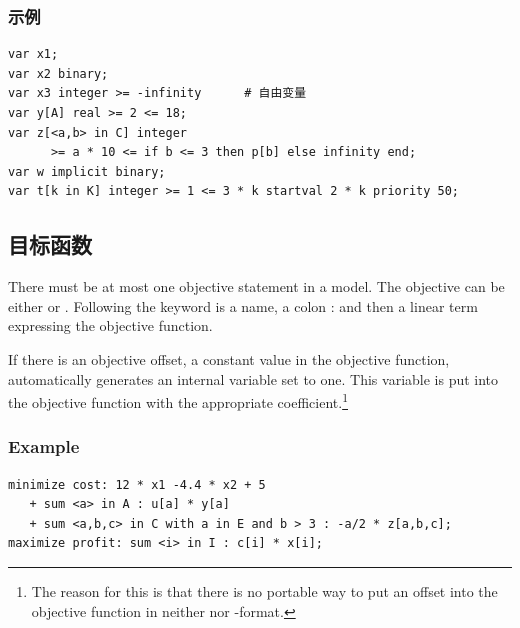 \subsubsection{示例}
{\small
\begin{verbatim}
var x1;
var x2 binary;
var x3 integer >= -infinity      # 自由变量
var y[A] real >= 2 <= 18;
var z[<a,b> in C] integer
      >= a * 10 <= if b <= 3 then p[b] else infinity end;
var w implicit binary;
var t[k in K] integer >= 1 <= 3 * k startval 2 * k priority 50;
\end{verbatim}
}



\subsection{目标函数}
There must be at most one objective statement in a model. The objective
can be either  or . Following the
keyword is a name, a colon : and then a linear term expressing the
objective function.

If there is an objective offset, \ie a constant value in the
objective function, \zimpl automatically generates an internal
variable  set to one. This variable is put into the
objective function with the appropriate coefficient.\footnote{The reason for
this is that there is no portable way to put an offset into the
objective function in neither \lpf nor \mps-format.}

\subsubsection{Example}
{\small
\begin{verbatim}
minimize cost: 12 * x1 -4.4 * x2 + 5
   + sum <a> in A : u[a] * y[a]
   + sum <a,b,c> in C with a in E and b > 3 : -a/2 * z[a,b,c];
maximize profit: sum <i> in I : c[i] * x[i];
\end{verbatim}
}

